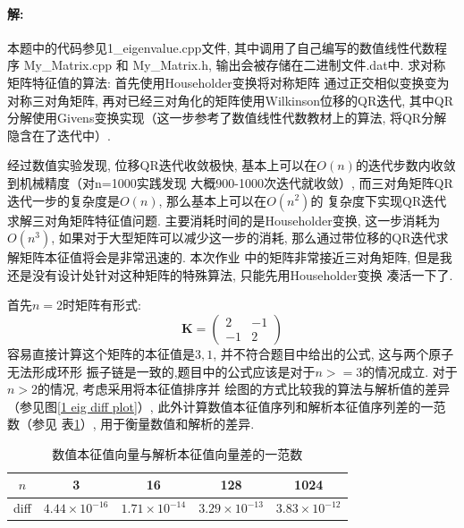 \documentclass[a4paper,zihao=5,UTF8]{ctexart}
\newcommand{\mb}[1]{\mathbf{#1}}
\begin{document}
	\paragraph{解:}本题中的代码参见1\_eigenvalue.cpp文件, 其中调用了自己编写的数值线性代数程序
	My\_Matrix.cpp 和 My\_Matrix.h, 输出会被存储在二进制文件.dat中. 求对称矩阵特征值的算法: 首先使用Householder变换将对称矩阵
	通过正交相似变换变为对称三对角矩阵, 再对已经三对角化的矩阵使用Wilkinson位移的QR迭代, 其中QR
	分解使用Givens变换实现（这一步参考了数值线性代数教材上的算法, 将QR分解隐含在了迭代中）.
	\par 
	经过数值实验发现, 位移QR迭代收敛极快, 基本上可以在$O(n)$的迭代步数内收敛到机械精度（对n=1000实践发现
	大概900-1000次迭代就收敛）, 而三对角矩阵QR迭代一步的复杂度是$O(n)$, 那么基本上可以在$O(n^2)$的
	复杂度下实现QR迭代求解三对角矩阵特征值问题. 主要消耗时间的是Householder变换, 这一步消耗为$O(n^3)$, 
	如果对于大型矩阵可以减少这一步的消耗, 那么通过带位移的QR迭代求解矩阵本征值将会是非常迅速的. 本次作业
	中的矩阵非常接近三对角矩阵, 但是我还是没有设计处针对这种矩阵的特殊算法, 只能先用Householder变换
	凑活一下了. 
	\par 
	首先$n = 2$时矩阵有形式:
	\begin{equation}
		\mb{K} = 
		\begin{pmatrix}
			2 & -1\\
			-1 & 2
		\end{pmatrix}
	\end{equation}
	容易直接计算这个矩阵的本征值是$3, 1$, 并不符合题目中给出的公式, 这与两个原子无法形成环形
	振子链是一致的,题目中的公式应该是对于$n>=3$的情况成立. 对于$n>2$的情况, 考虑采用将本征值排序并
	绘图的方式比较我的算法与解析值的差异（参见图\ref{1 eig diff plot}）, 此外计算数值本征值序列和解析本征值序列差的一范数（参见
	表\ref{1 eig diff table}）, 
	用于衡量数值和解析的差异.
	\begin{table}[htbp]
		\centering
		\caption{数值本征值向量与解析本征值向量差的一范数}
		\begin{tabular}[htbp]{ccccc}
			\toprule
			$n$ & 3& 16& 128& 1024 \\
			\midrule
			diff & $4.44\times10^{-16}$& $1.71\times10^{-14}$& $3.29\times10^{-13}$& $3.83\times10^{-12}$ \\
			\bottomrule
		\end{tabular}
		\label{1 eig diff table}
	\end{table}
\end{document}
